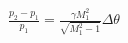 \documentclass[10pt]{article}
\begin{document}
\begin{align*}\frac{p_{2}-p_{1}}{p_{1}}
=
\frac{ \gamma M_{1}^{2} }{ \sqrt{M_{1}^{2}-1}}
\Delta \theta
\end{align*}
\end{document}
